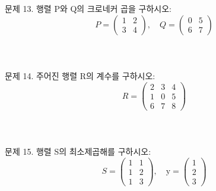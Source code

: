 \documentclass[fleqn]{article}
\begin{document}
\noindent 문제 13. 행렬 P와 Q의 크로네커 곱을 구하시오:  
\[ P = \begin{pmatrix} 1 & 2 \\ 3 & 4 \end{pmatrix}, \quad Q = \begin{pmatrix} 0 & 5 \\ 6 & 7 \end{pmatrix} \]  
\\\\\\

\noindent 문제 14. 주어진 행렬 R의 계수를 구하시오:  
\[ R = \begin{pmatrix} 2 & 3 & 4 \\ 1 & 0 & 5 \\ 6 & 7 & 8 \end{pmatrix} \]  
\\\\\\

\noindent 문제 15. 행렬 S의 최소제곱해를 구하시오:  
\[ S = \begin{pmatrix} 1 & 1 \\ 1 & 2 \\ 1 & 3 \end{pmatrix}, \quad \text{y} = \begin{pmatrix} 1 \\ 2 \\ 3 \end{pmatrix} \]  
\\\\\\

\end{document}
